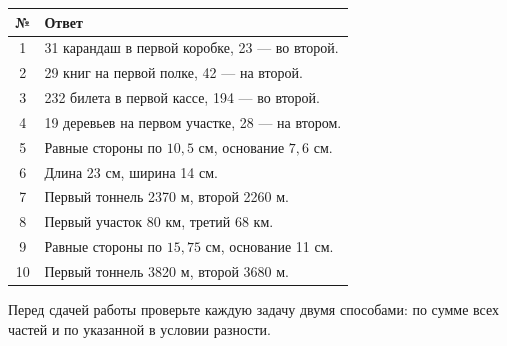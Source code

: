 \documentclass[a4paper,12pt]{article}
\begin{document}
\renewcommand{\arraystretch}{1.4}
\begin{tabularx}{\linewidth}{@{}c X@{}}
\toprule
\textbf{№} & \textbf{Ответ} \\
\midrule
1 & 31 карандаш в первой коробке, 23 --- во второй. \\
2 & 29 книг на первой полке, 42 --- на второй. \\
3 & 232 билета в первой кассе, 194 --- во второй. \\
4 & 19 деревьев на первом участке, 28 --- на втором. \\
5 & Равные стороны по $10{,}5$ см, основание $7{,}6$ см. \\
6 & Длина 23 см, ширина 14 см. \\
7 & Первый тоннель 2370 м, второй 2260 м. \\
8 & Первый участок 80 км, третий 68 км. \\
9 & Равные стороны по $15{,}75$ см, основание 11 см. \\
10 & Первый тоннель 3820 м, второй 3680 м. \\
\bottomrule
\end{tabularx}

\vfill
\begin{center}
\small\color{darkaccent}
Перед сдачей работы проверьте каждую задачу двумя способами: по сумме всех частей и по указанной в условии разности.
\end{center}
\end{document}
